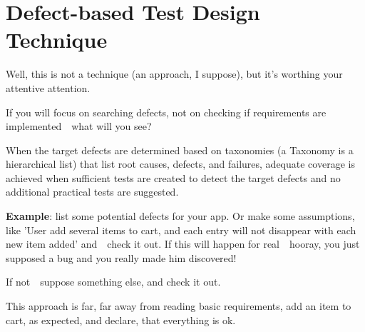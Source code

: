 \section{Defect-based Test Design Technique}
\label{sec:Defect-based Test Design Technique}

Well, this is not a technique (an approach, I suppose), but it's worthing your attentive attention.

If you will focus on searching defects, not on checking if requirements are implemented~\textemdash~what will you see?

When the target defects are determined based on taxonomies (a Taxonomy is a hierarchical list) that list root causes, defects, and failures, adequate coverage is achieved when sufficient tests are created to detect the target defects and no additional practical tests are suggested.

\textbf{Example}: list some potential defects for your app. Or make some assumptions, like 'User add several items to cart, and each entry will not disappear with each new item added' and~\textemdash~check it out. If this will happen for real~\textemdash~hooray, you just supposed a bug and you really made him discovered! 

If not~\textemdash~suppose something else, and check it out.

This approach is far, far away from reading basic requirements, add an item to cart, as expected, and declare, that everything is ok.
